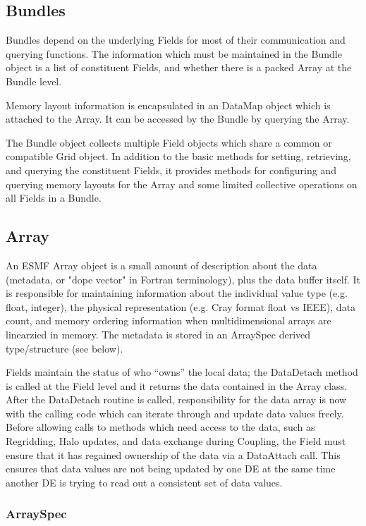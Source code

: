 \subsection{Bundles}

Bundles depend on the underlying Fields for most of their 
communication and querying functions.  The information which
must be maintained in the Bundle object is a list of constituent
Fields, and whether there is a packed Array at the Bundle level.

Memory layout information is encapsulated in an DataMap object which
is attached to the Array.  It can be accessed by the Bundle
by querying the Array.

The Bundle object collects multiple Field objects which share a
common or compatible Grid object.  In addition to the basic methods for
setting, retrieving, and querying the constituent Fields, it provides
methods for configuring and querying memory layouts for the Array
and some limited collective operations on all Fields in a Bundle.

\subsection{Array}

An ESMF Array object is a small amount of description about
the data (metadata, or "dope vector" in Fortran terminology), 
plus the data buffer itself.  It is 
responsible for maintaining
information about the individual value type (e.g. float, integer), 
the physical representation (e.g. Cray format float vs IEEE), 
data count, and memory ordering information when multidimensional
arrays are linearzied in memory.
The metadata is stored in an ArraySpec
derived type/structure (see below).

Fields maintain the status of who ``owns'' the local data;
the DataDetach method is called at the Field level and it
returns the data contained in the Array class.
After the DataDetach routine is called, responsibility for
the data array is now with the calling code which can iterate through
and update data values freely.  Before allowing calls to methods which need
access to the data, such as Regridding, Halo updates, and
data exchange during Coupling, the Field must ensure that it
has regained ownership of the data via a DataAttach call.  
This ensures that data values are not being updated by one
DE at the same time another DE is trying to read out a consistent
set of data values.

\subsubsection{ArraySpec}

